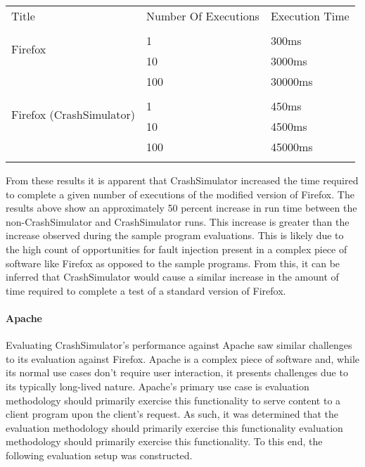                 \begin{table}[H]
                    \scriptsize{}
                    \begin{tabular}{l l l}
                        \toprule{}
                        Title & Number Of Executions & Execution Time \\
                        \multirow{3}{*}{Firefox} \\
                        & 1 & 300ms \\
                        & 10 & 3000ms \\
                        & 100 & 30000ms \\
                        \multirow{3}{*}{Firefox (CrashSimulator)} \\
                        & 1 & 450ms \\
                        & 10 & 4500ms \\
                        & 100 & 45000ms \\
                        \bottomrule{}
                    \end{tabular}
                \end{table}

                From these results it is apparent that CrashSimulator  increased the time required to complete a given
                number of executions of the modified version of Firefox. The results above show an approximately 50
                percent increase in run time between the non-CrashSimulator and CrashSimulator runs. This increase is
                greater than the increase observed during the sample program evaluations. This is likely due to the high
                count of opportunities for fault injection present in a complex piece of software like Firefox as
                opposed to the sample programs. From this, it can be inferred that CrashSimulator would cause a similar
                increase in the amount of time required to complete a test of a standard version of Firefox.

            \paragraph{Apache}

                Evaluating CrashSimulator's performance against Apache saw similar challenges to its evaluation against
                Firefox. Apache is a complex piece of software and, while its normal use cases don't require user
                interaction, it presents challenges due to its typically long-lived nature. Apache's primary use case is
                evaluation methodology should primarily exercise this functionality to serve content to a client program
                upon the client's request. As such, it was determined that the evaluation methodology should primarily
                exercise this functionality evaluation methodology should primarily exercise this functionality. To this
                end, the following evaluation setup was constructed.


